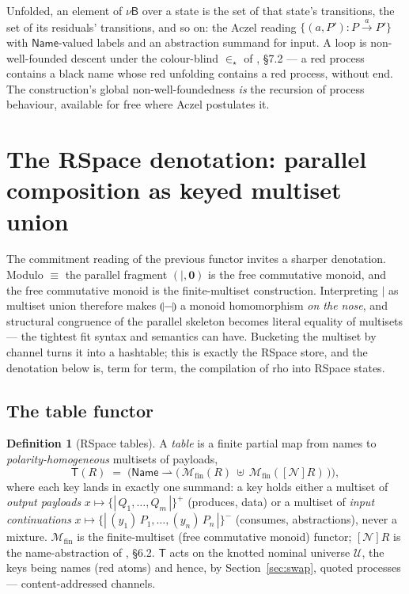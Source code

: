 \documentclass[11pt]{article}
\newcommand{\Zero}{\mathbf{0}}
\newcommand{\Par}{\mathbin{\mid}}
\newcommand{\abs}[2]{(#1)\,#2}                  %
\newcommand{\nset}[1]{[\mathcal{N}]#1}
\newcommand{\Name}{\mathsf{Name}}
\newcommand{\B}{\mathsf{B}}
\newcommand{\sem}[1]{\llparenthesis #1\rrparenthesis}   %
\newcommand{\lts}[1]{\xrightarrow{\,#1\,}}
\newcommand{\scong}{\equiv}
\newcommand{\Tab}{\mathsf{T}}                  %
\newcommand{\bag}[1]{\{\!|\,#1\,|\!\}}         %
\newcommand{\Mfin}{\mathcal{M}_{\mathrm{fin}}} %
\theoremstyle{plain}
\theoremstyle{definition}
\newtheorem{definition}[theorem]{Definition}
\begin{document}
Unfolded, an element of $\nu\B$ over a state is the set of that state's
transitions, the set of its residuals' transitions, and so on: the Aczel reading
$\{(a,P'):P\lts a P'\}$ with $\Name$-valued labels and an abstraction summand for
input. A loop is non-well-founded descent under the colour-blind $\in_\star$ of
\cite{knot}, \S7.2 --- a red process contains a black name whose red unfolding
contains a red process, without end. The construction's global
non-well-foundedness \emph{is} the recursion of process behaviour, available for
free where Aczel postulates it.

\section{The RSpace denotation: parallel composition as keyed multiset union}\label{sec:denotation}

The commitment reading of the previous functor invites a sharper denotation. Modulo
$\scong$ the parallel fragment $(\Par,\Zero)$ is the free commutative monoid, and
the free commutative monoid is the finite-multiset construction. Interpreting
$\Par$ as multiset union therefore makes $\sem{-}$ a monoid homomorphism
\emph{on the nose}, and structural congruence of the parallel skeleton becomes
literal equality of multisets --- the tightest fit syntax and semantics can have.
Bucketing the multiset by channel turns it into a hashtable; this is exactly the
RSpace store, and the denotation below is, term for term, the compilation of rho
into RSpace states.

\subsection{The table functor}

\begin{definition}[RSpace tables]\label{def:table}
A \emph{table} is a finite partial map from names to \emph{polarity-homogeneous}
multisets of payloads,
\[
  \Tab(R) \;=\; \Big(\Name \rightharpoonup
     \big(\,\Mfin(R)\ \uplus\ \Mfin(\nset R)\,\big)\Big),
\]
where each key lands in exactly one summand: a key holds either a multiset of
\emph{output payloads} $x\mapsto\bag{Q_1,\dots,Q_m}^{+}$ (produces, data) or a
multiset of \emph{input continuations} $x\mapsto\bag{\abs{y_1}{P_1},\dots,
\abs{y_n}{P_n}}^{-}$ (consumes, abstractions), never a mixture. $\Mfin$ is the
finite-multiset (free commutative monoid) functor; $\nset R$ is the
name-abstraction of \cite{knot}, \S6.2. $\Tab$ acts on the knotted nominal
universe $\mathcal U$, the keys being names (red atoms) and hence, by
Section~\ref{sec:swap}, quoted processes --- content-addressed channels.
\end{definition}
\end{document}
